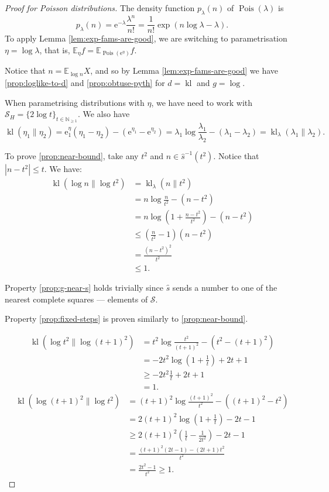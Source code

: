 \documentclass{article}
\theoremstyle{definition}
\theoremstyle{definition}
\newcommand{\natnums}{\mathbb{N}}
\newcommand{\expectE}{\mathbb{E}}
\newcommand{\Pois}{\operatorname{Pois}}
\newcommand{\kl}{\operatorname{kl}}
\newcommand{\Eta}{H}
\newcommand{\e}{\mathrm{e}}
\begin{document}
\begin{proof}[Proof for Poisson distributions]
	The density function $p_{\lambda}(n)$ of $\Pois(\lambda)$ is
	\[
		p_\lambda(n) = \e^{-\lambda} \frac{\lambda^n}{n!} = \frac{1}{n!}\exp(n \log \lambda - \lambda).
	\]
	To apply Lemma \ref{lem:exp-fams-are-good}, we are switching to parametrisation $\eta = \log \lambda$, that is, $\expectE_\eta f = \expectE_{\Pois(\e^\eta)} f$.
	
	Notice that $n = \expectE_{\log n} X$, and so by Lemma \ref{lem:exp-fams-are-good} we have \ref{prop:loglike-to-d} and \ref{prop:obtuse-pyth} for $d = \kl$ and $g = \log$.
	
	When parametrising distributions with $\eta$, we have need to work with $\mathcal{S}_\Eta = \{2 \log t\}_{t \in \natnums_{\ge 1}}$.  We also have
	\[
		\kl(\eta_1 \| \eta_2) =
		\e^\eta_1(\eta_1 - \eta_2) - (\e^{\eta_1} - \e^{\eta_2}) = \lambda_1 \log\frac{\lambda_1}{\lambda_2} - (\lambda_1-\lambda_2) = \kl_\lambda(\lambda_1 \| \lambda_2).
	\]
	
	To prove \ref{prop:near-bound}, take any $t^2$ and $n \in \hat{s}^{-1}(t^2)$. Notice that $| n - t^2| \le t$. We have:
	\begin{align*}
		\kl( \log n \| \log t^2) &= \kl_\lambda (n \| t^2)
		\\
		&= n \log \frac{n}{t^2} - (n - t^2)
		\\
		&= n \log \left(1 + \frac{n - t^2}{t^2}\right) - (n - t^2)
		\\
		&\le \left(\frac{n}{t^2} - 1\right) (n - t^2)
		\\
		&= \frac{(n - t^2)^2}{t^2}
		\\
		&\le 1.
	\end{align*}
	
	Property \ref{prop:g-near-s} holds trivially since $\hat{s}$ sends a number to one of the nearest complete squares --- elements of $\mathcal{S}$.
	
	Property \ref{prop:fixed-steps} is proven similarly to \ref{prop:near-bound}.
	
	\begin{align*}
		\kl(\log t^2 \| \log (t+1)^2) &= t^2 \log \frac{t^2}{(t+1)^2} - (t^2 - (t+1)^2)
		\\
		&=-2t^2 \log \left(1 + \frac{1}{t}\right) + 2t + 1
		\\
		&\ge -2t^2 \frac{1}{t} + 2t + 1
		\\&=1.
	\end{align*}
	\begin{align*}
		\kl(\log (t+1)^2 \| \log t^2) &= (t+1)^2 \log \frac{(t+1)^2}{t^2} - ((t+1)^2 - t^2)
		\\
		&= 2(t+1)^2 \log\left(1 + \frac{1}{t}\right) - 2t - 1
		\\
		&\ge 2(t+1)^2 \left(\frac{1}{t} - \frac{1}{2t^2}\right) - 2t - 1
		\\
		&= \frac{(t+1)^2(2t - 1) - (2t+1)t^2}{t^2}
		\\
		&= \frac{2t^2 - 1}{t^2} \ge 1.
	\end{align*}
	

\end{proof}
\end{document}
